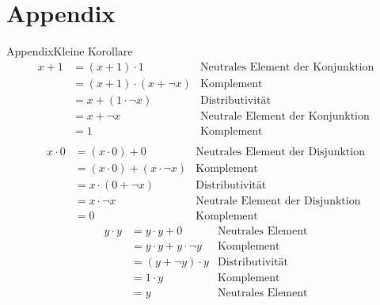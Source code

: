 
\section{Appendix}

\begin{frame}[allowframebreaks]{Appendix}{Kleine Korollare\vspace{0.5cm}}
  \begin{align*}
    x + 1 &= (x + 1) \cdot 1 & \text{Neutrales Element der Konjunktion}\\
    &= (x + 1) \cdot (x + \neg x) & \text{Komplement}\\
    &= x + (1 \cdot \neg x)& \text{Distributivität}\\
    &= x + \neg x& \text{Neutrale Element der Konjunktion}\\
    &=1& \text{Komplement}\\[0.5cm]
  \end{align*}
  \begin{align*}
    x \cdot 0 &= (x \cdot 0) + 0 & \text{Neutrales Element der Disjunktion}\\
              &= (x \cdot 0) + (x \cdot \neg x) & \text{Komplement}\\
              &= x \cdot (0 + \neg x) & \text{Distributivität}\\
              &= x \cdot \neg x & \text{Neutrale Element der Disjunktion}\\
              &=0 & \text{Komplement}
  \end{align*}
  \pagebreak
  \begin{align*}
    y \cdot  y &= y\cdot y + 0             & \text{Neutrales Element}\\
               &= y\cdot y + y\cdot \neg y & \text{Komplement}\\
               &= (y+\neg y) \cdot  y      & \text{Distributivität}\\
               &= 1 \cdot  y               & \text{Komplement}\\
               &= y                        & \text{Neutrales Element}
  \end{align*}
\end{frame}
